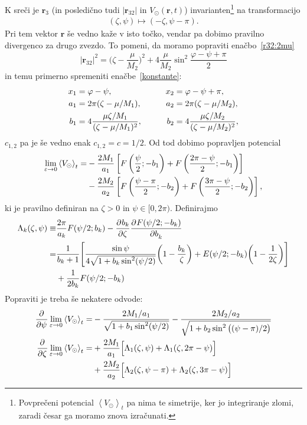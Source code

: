 \documentclass[12pt, a4paper]{article}
\renewcommand{\r}{
    \ensuremath{\mathbf{r}}
}
\newcommand{\der}[3][]{
    \ensuremath{ \frac{\partial^{#1} #2}{\partial #3^{#1}} }
}
\newcommand{\avgt}[1]{
	\ensuremath{\left\langle #1 \right\rangle_t}
}
\begin{document}
K sre\v ci je $\r_3$ (in posledi\v cno tudi $|\r_{32}|$ in $V_\odot(\r,t)$) invarianten\footnote{Povpre\v ceni
potencial $\avgt{V_\odot}$ pa nima te simetrije, ker jo integriranje zlomi, zaradi \v cesar ga moramo znova
izra\v cunati.} na transformacijo
\begin{align*}
	(\zeta, \psi) \mapsto (-\zeta, \psi - \pi).
\end{align*}
Pri tem vektor $\r$ \v se vedno ka\v ze v isto to\v cko, vendar pa dobimo pravilno divergenco za drugo zvezdo.
To pomeni, da moramo popraviti ena\v cbo~\eqref{r32:2mu}
\begin{equation}
	|\r_{32}|^2 = \Big(\zeta - \frac{\mu}{M_2}\Big)^2 + 4\frac{\mu}{M_2}\sin^2\frac{\varphi - \psi + \pi}{2}
\end{equation}
in temu primerno spremeniti ena\v cbe~\eqref{konstante}:
\begin{alignat}{3}
	x_1 &= \varphi - \psi, \qquad& x_2 &= \varphi - \psi + \pi, \notag \\
	a_1 &= 2\pi(\zeta - \mu/M_1), \qquad& a_2 &= 2\pi(\zeta - \mu/M_2), \notag \\
	b_1 &= 4\frac{\mu\zeta/M_1}{(\zeta - \mu/M_1)^2}, \qquad& b_2 &= 4\frac{\mu\zeta/M_2}{(\zeta - \mu/M_2)^2},
\end{alignat}
$c_{1,2}$ pa je \v se vedno enak $c_{1,2} = c = 1/2$. Od tod dobimo popravljen potencial
\begin{align}
	\lim_{\varepsilon \to 0} \avgt{V_\odot} = &- \frac{2M_1}{a_1}\left[F\left(\frac{\psi}{2}; -b_1\right)
		+ F\left(\frac{2\pi - \psi}{2}; -b_1\right)\right] \notag \\
	&- \frac{2 M_2}{a_2}\left[F\left(\frac{\psi - \pi}{2}; -b_2\right)
		+ F\left(\frac{3\pi - \psi}{2}; -b_2\right)\right],
\end{align}
ki je pravilno definiran na $\zeta > 0$ in $\psi \in [0, 2\pi)$. Definirajmo
\begin{align}
	\Lambda_k (\zeta, \psi) \equiv &\frac{2\pi}{a_k}F(\psi/2;b_k) - \der{b_k}{\zeta}\der{F(\psi/2;-b_k)}{b_k} \notag \\
	= &\frac{1}{b_k + 1}\Bigg[\frac{\sin\psi}{4\sqrt{1 + b_k\sin^2(\psi/2)}}
		\bigg(1 - \frac{b_k}{\zeta}\bigg) + E(\psi/2; -b_k)\bigg(1 - \frac{1}{2\zeta}\bigg)\Bigg] \notag \\
	&+\frac{1}{2b_k}F(\psi/2; -b_k)
\end{align}
Popraviti je treba \v se nekatere odvode:
\begin{align}
	\der{}{\psi}\lim_{\varepsilon \to 0} \avgt{V_\odot} = &- \frac{2M_1/a_1}{\sqrt{1 + b_1\sin^2(\psi/2)}}
		- \frac{2M_2/a_2}{\sqrt{1 + b_2\sin^2\big((\psi - \pi)/2\big)}} \\
	\der{}{\zeta}\lim_{\varepsilon \to 0} \avgt{V_\odot} = &+ \frac{2M_1}{a_1}\Big[\Lambda_1(\zeta, \psi)
	+ \Lambda_1(\zeta, 2\pi - \psi)\Big] \notag \\
	&+ \frac{2M_2}{a_2}\Big[\Lambda_2(\zeta, \psi - \pi) + \Lambda_2(\zeta, 3\pi - \psi)\Big]
\end{align}
\end{document}
